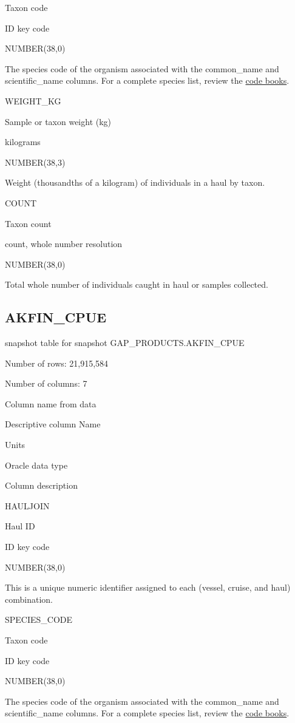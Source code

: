 \documentclass[
  letterpaper,
  oneside,
  open=any]{scrbook}
\begin{document}
Taxon code

ID key code

NUMBER(38,0)

The species code of the organism associated with the common\_name and
scientific\_name columns. For a complete species list, review the
\href{https://www.fisheries.noaa.gov/resource/document/groundfish-survey-species-code-manual-and-data-codes-manual}{code
books}.

WEIGHT\_KG

Sample or taxon weight (kg)

kilograms

NUMBER(38,3)

Weight (thousandths of a kilogram) of individuals in a haul by taxon.

COUNT

Taxon count

count, whole number resolution

NUMBER(38,0)

Total whole number of individuals caught in haul or samples collected.

\subsection{AKFIN\_CPUE}\label{akfin_cpue}

snapshot table for snapshot GAP\_PRODUCTS.AKFIN\_CPUE

Number of rows: 21,915,584

Number of columns: 7

Column name from data

Descriptive column Name

Units

Oracle data type

Column description

HAULJOIN

Haul ID

ID key code

NUMBER(38,0)

This is a unique numeric identifier assigned to each (vessel, cruise,
and haul) combination.

SPECIES\_CODE

Taxon code

ID key code

NUMBER(38,0)

The species code of the organism associated with the common\_name and
scientific\_name columns. For a complete species list, review the
\href{https://www.fisheries.noaa.gov/resource/document/groundfish-survey-species-code-manual-and-data-codes-manual}{code
books}.
\end{document}

